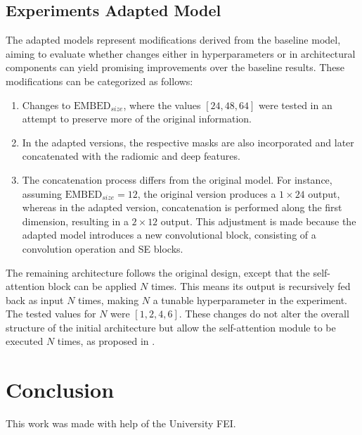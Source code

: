 \documentclass[journal,twoside,web]{ieeecolor}
\begin{document}
\subsection{Experiments Adapted Model}

The adapted models represent modifications derived from the baseline model, aiming to evaluate whether changes either in hyperparameters or in architectural components can yield promising improvements over the baseline results. These modifications can be categorized as follows:  

\begin{enumerate}  

\item Changes to $\text{EMBED}_{size}$, where the values $[24, 48, 64]$ were tested in an attempt to preserve more of the original information.  

\item In the adapted versions, the respective masks are also incorporated and later concatenated with the radiomic and deep features.  

\item The concatenation process differs from the original model. For instance, assuming $\text{EMBED}_{size} = 12$, the original version produces a $1\times24$ output, whereas in the adapted version, concatenation is performed along the first dimension, resulting in a $2\times12$ output. This adjustment is made because the adapted model introduces a new convolutional block, consisting of a convolution operation and \gls{SE} blocks.  

\end{enumerate}  

The remaining architecture follows the original design, except that the self-attention block can be applied $N$ times. This means its output is recursively fed back as input $N$ times, making $N$ a tunable hyperparameter in the experiment. The tested values for $N$ were $[1, 2, 4, 6]$. These changes do not alter the overall structure of the initial architecture but allow the self-attention module to be executed $N$ times, as proposed in \cite{vaswaniAttentionAllYou2023}. 


\section{Conclusion}

This work was made with help of the University FEI.
\end{document}
